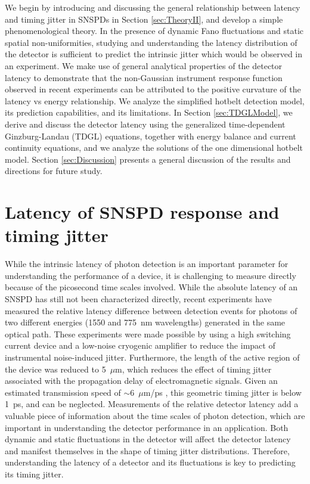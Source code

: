 \documentclass[%
reprint,
 amsmath,amssymb,
aps,
pra,
]{revtex4-1}
\begin{document}
\quad We begin by introducing and discussing the general relationship between latency and timing jitter in SNSPDs in Section \ref{sec:TheoryII}, and develop a simple phenomenological theory.  In the presence of dynamic Fano fluctuations and static spatial non-uniformities, studying and understanding the latency distribution of the detector is sufficient to predict the intrinsic jitter which would be observed in an experiment. We make use of general analytical properties of the detector latency to demonstrate that the non-Gaussian instrument response function observed in recent experiments \cite{korzh_demonstrating_2018} can be attributed to the positive curvature of the latency vs energy relationship.  We analyze the simplified hotbelt detection model, its prediction capabilities, and its limitations.  In Section \ref{sec:TDGLModel}, we derive and discuss the detector latency using the generalized time-dependent Ginzburg-Landau (TDGL) equations, together with energy balance and current continuity equations, and we analyze the solutions of the one dimensional hotbelt model.  Section \ref{sec:Discussion} presents a general discussion of the results and directions for future study.

\section{\label{sec:TheoryII}Latency of SNSPD response and timing jitter}
\quad While the intrinsic latency of photon detection is an important parameter for understanding the performance of a device, it is challenging to measure directly because of the picosecond time scales involved. While the absolute latency of an SNSPD has still not been characterized directly, recent experiments \cite{korzh_demonstrating_2018} have measured the relative latency difference between detection events for photons of two different energies (1550 and 775~nm wavelengths) generated in the same optical path. These experiments were made possible by using a high switching current device and a low-noise cryogenic amplifier to reduce the impact of instrumental noise-induced jitter. Furthermore, the length of the active region of the device was reduced to 5~\(\mu\)m, which reduces the effect of timing jitter associated with the propagation delay of electromagnetic signals. Given an estimated transmission speed of \(\sim\)6~\(\mu\)m/ps \cite{zhao_single-photon_2017}, this geometric timing jitter is below 1~ps, and can be neglected.  Measurements of the relative detector latency add a valuable piece of information about the time scales of photon detection, which are important in understanding the detector performance in an application. Both dynamic and static fluctuations in the detector will affect the detector latency and manifest themselves in the shape of timing jitter distributions.  Therefore, understanding the latency of a detector and its fluctuations is key to predicting its timing jitter.
\end{document}
